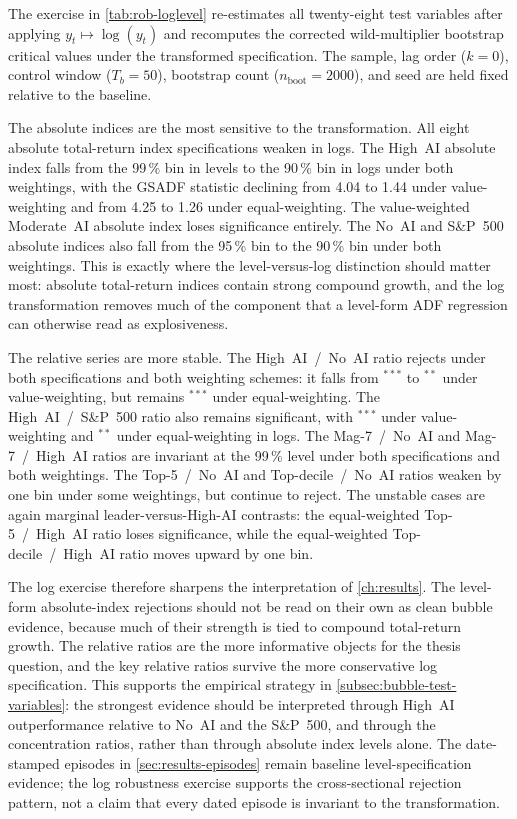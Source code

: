 The exercise in \cref{tab:rob-loglevel} re-estimates all twenty-eight test variables after applying $y_t\mapsto\log(y_t)$ and recomputes the corrected wild-multiplier bootstrap critical values under the transformed specification. The sample, lag order ($k=0$), control window ($T_b=50$), bootstrap count ($n_{\mathrm{boot}}=\num{2000}$), and seed are held fixed relative to the baseline.

The absolute indices are the most sensitive to the transformation. All eight absolute total-return index specifications weaken in logs. The High~AI absolute index falls from the 99\,\% bin in levels to the 90\,\% bin in logs under both weightings, with the GSADF statistic declining from 4.04 to 1.44 under value-weighting and from 4.25 to 1.26 under equal-weighting. The value-weighted Moderate~AI absolute index loses significance entirely. The No~AI and S\&P~500 absolute indices also fall from the 95\,\% bin to the 90\,\% bin under both weightings. This is exactly where the level-versus-log distinction should matter most: absolute total-return indices contain strong compound growth, and the log transformation removes much of the component that a level-form ADF regression can otherwise read as explosiveness.

The relative series are more stable. The High~AI~/~No~AI ratio rejects under both specifications and both weighting schemes: it falls from $^{***}$ to $^{**}$ under value-weighting, but remains $^{***}$ under equal-weighting. The High~AI~/~S\&P~500 ratio also remains significant, with $^{***}$ under value-weighting and $^{**}$ under equal-weighting in logs. The Mag-7~/~No~AI and Mag-7~/~High~AI ratios are invariant at the 99\,\% level under both specifications and both weightings. The Top-5~/~No~AI and Top-decile~/~No~AI ratios weaken by one bin under some weightings, but continue to reject. The unstable cases are again marginal leader-versus-High-AI contrasts: the equal-weighted Top-5~/~High~AI ratio loses significance, while the equal-weighted Top-decile~/~High~AI ratio moves upward by one bin.

The log exercise therefore sharpens the interpretation of \cref{ch:results}. The level-form absolute-index rejections should not be read on their own as clean bubble evidence, because much of their strength is tied to compound total-return growth. The relative ratios are the more informative objects for the thesis question, and the key relative ratios survive the more conservative log specification. This supports the empirical strategy in \cref{subsec:bubble-test-variables}: the strongest evidence should be interpreted through High~AI outperformance relative to No~AI and the S\&P~500, and through the concentration ratios, rather than through absolute index levels alone. The date-stamped episodes in \cref{sec:results-episodes} remain baseline level-specification evidence; the log robustness exercise supports the cross-sectional rejection pattern, not a claim that every dated episode is invariant to the transformation.


